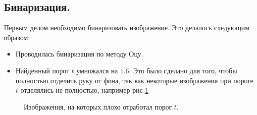 \documentclass[12pt,fleqn]{article}
\begin{document}
\subsection{Бинаризация.}
Первым делом необходимо бинаризовать изображение. Это делалось следующим образом:
\begin{itemize}
\item Проводилась бинаризация по методу Оцу.
\item Найденный порог $t$ умножался на $1.6$. Это было сделано для того, чтобы полностью отделить руку от фона, так как некоторые изображения при пороге $t$ отделялись не полностью, например рис \hyperref[Image1]{1}
\end{itemize}


\begin{figure}[h]
\begin{minipage}[h]{0.49\linewidth}
\end{minipage}
\hfill
\begin{minipage}[h]{0.49\linewidth}
\end{minipage}
\caption{Изображения, на которых плохо отработал порог $t$.}
\label{Image1}
\end{figure}
\end{document}
